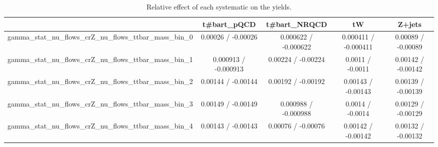 \documentclass[10pt]{article}
\begin{document}
\begin{table}[htbp]
\begin{center}
\begin{tabular}{|c|c|c|c|c|}
\hline 
      & t#bar{t}_{pQCD}      & t#bar{t}_{NRQCD}      & tW      & Z+jets \\ 
\hline 
  gamma_stat_nu_flows_crZ_nu_flows_ttbar_mass_bin_0 & 0.00026 / -0.00026 & 0.000622 / -0.000622 & 0.000411 / -0.000411 & 0.00089 / -0.00089 \\ 
  gamma_stat_nu_flows_crZ_nu_flows_ttbar_mass_bin_1 & 0.000913 / -0.000913 & 0.00224 / -0.00224 & 0.0011 / -0.0011 & 0.00142 / -0.00142 \\ 
  gamma_stat_nu_flows_crZ_nu_flows_ttbar_mass_bin_2 & 0.00144 / -0.00144 & 0.00192 / -0.00192 & 0.00143 / -0.00143 & 0.00139 / -0.00139 \\ 
  gamma_stat_nu_flows_crZ_nu_flows_ttbar_mass_bin_3 & 0.00149 / -0.00149 & 0.000988 / -0.000988 & 0.0014 / -0.0014 & 0.00129 / -0.00129 \\ 
  gamma_stat_nu_flows_crZ_nu_flows_ttbar_mass_bin_4 & 0.00143 / -0.00143 & 0.00076 / -0.00076 & 0.00142 / -0.00142 & 0.00132 / -0.00132 \\ 
\hline 
\end{tabular} 
\caption{Relative effect of each systematic on the yields.} 
\end{center} 
\end{table} 
\end{document}

